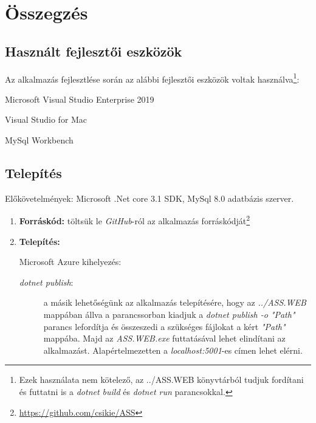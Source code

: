 \chapter{Összegzés} %
\label{ch:sum}
\section{Használt fejlesztői eszközök}
Az alkalmazás fejlesztlése során az alábbi fejlesztői eszközök voltak használva\footnote{Ezek használata nem kötelező, az ../ASS.WEB könyvtárból tudjuk fordítani és futtatni is a \emph{dotnet build} és \emph{dotnet run} parancsokkal.}:
\begin{compactitem}
    \item Microsoft Visual Studio Enterprise 2019
    \item Visual Studio for Mac 
    \item MySql Workbench
\end{compactitem}
\section{Telepítés}
Előkövetelmények: Microsoft .Net core 3.1 SDK, MySql 8.0 adatbázis szerver.
\begin{enumerate}
    \item \textbf{Forráskód:} töltsük le \emph{GitHub}-ról az alkalmazás forráskódját\footnote{\url{https://github.com/csikie/ASS}}
    \item \textbf{Telepítés:}
    \begin{description}
        \item[Microsoft Azure kihelyezés:] \cite{Azure}
        \item[\emph{dotnet publish}:] a másik lehetőségünk az alkalmazás telepítésére, hogy az \emph{../ASS.WEB} mappában állva a parancssorban kiadjuk a \emph{dotnet publish -o "Path"} parancs lefordítja és összeszedi a szükséges fájlokat a kért \emph{"Path"} mappába. Majd az \emph{ASS.WEB.exe} futtatásával lehet elindítani az alkalmazást. Alapértelmezetten a \emph{localhost:5001}-es címen lehet elérni.
    \end{description}
\end{enumerate}

